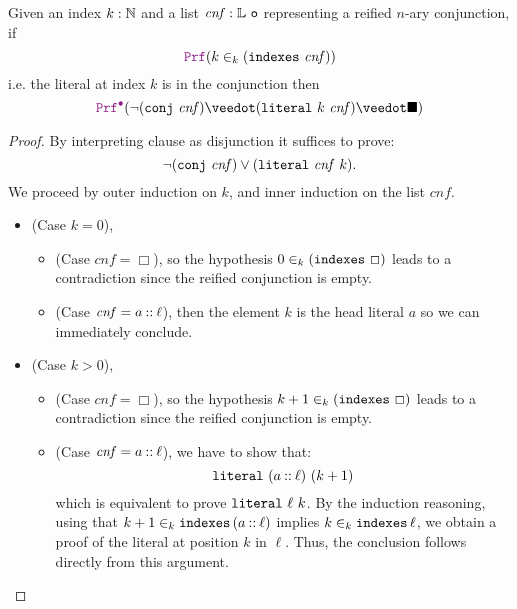 \begin{lemma}
Given an index $k: \mathbb{N}$ and a list $\mathit{cnf}: \mathbb{L}~\texttt{o}$ representing a reified $n$-ary conjunction, if
\[
  \prf (k \in_k (\kw{indexes}~\mathit{cnf}))
\]
i.e. the literal at index $k$ is in the conjunction then
\[
  \prfcl (\neg (\kw{conj}~\mathit{cnf}) \veedot (\kw{literal}~k~\mathit{cnf}) \veedot \nil)
\]
\begin{proof}
By interpreting clause as disjunction it suffices to prove:
\[
    \neg (\texttt{\upshape{conj}}~\mathit{cnf}) \lor (\texttt{\upshape{literal}}~\mathit{cnf}~k).
\]
We proceed by outer induction on $k$, and inner induction on the list $\mathit{cnf}$.
\begin{itemize}
  \item (Case $k = 0$),
    \begin{itemize}
      \item (Case $\mathit{cnf} = \Box$), so the hypothesis $0 \in_k (\texttt{\upshape{indexes}}~\Box)$ leads to a contradiction since the reified conjunction is empty.
      \item (Case $\mathit{cnf} = a \mathbin{::} \ell$),  then the element $k$ is the head literal $a$ so we can immediately conclude.
    \end{itemize}
  \item (Case $k > 0$),
      \begin{itemize}
      \item (Case $\mathit{cnf} = \Box$), so the hypothesis $k + 1 \in_k (\texttt{\upshape{indexes}}~\Box)$ leads to a contradiction since the reified conjunction is empty.
      \item (Case $\mathit{cnf} = a \mathbin{::} \ell$), we have to show that:
        \[
            \texttt{\upshape{literal}}~(a \mathbin{::} \ell)~(k+1)
        \]
        which is equivalent to prove $\texttt{\upshape{literal}}~\ell~k$.
        By the induction reasoning, using that $k+1 \in_k \texttt{\upshape{indexes}}\,(a \mathbin{::} \ell)$ implies $k \in_k \texttt{\upshape{indexes}}\,\ell$, we obtain a proof of the literal at position $k$ in $\ell$.
        Thus, the conclusion follows directly from this argument.
    \end{itemize}
\end{itemize}
\end{proof}
\label{lem:and-pos}
\end{lemma}

